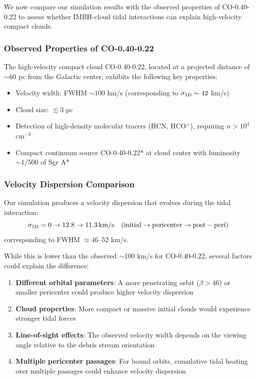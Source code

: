 \documentclass[twocolumn,amsmath,amssymb,prd,superscriptaddress,nofootinbib]{revtex4-2}
\begin{document}
We now compare our simulation results with the observed properties of CO-0.40-0.22 \cite{Oka2016,Oka2017} to assess whether IMBH-cloud tidal interactions can explain high-velocity compact clouds.

\subsubsection{Observed Properties of CO-0.40-0.22}

The high-velocity compact cloud CO-0.40-0.22, located at a projected distance of $\sim$60 pc from the Galactic center, exhibits the following key properties:
\begin{itemize}
    \item Velocity width: FWHM $\sim 100$ km/s (corresponding to $\sigma_{\rm 1D} \sim 42$ km/s)
    \item Cloud size: $\lesssim 3$ pc
    \item Detection of high-density molecular tracers (HCN, HCO$^+$), requiring $n > 10^4$ cm$^{-3}$
    \item Compact continuum source CO-0.40-0.22* at cloud center with luminosity $\sim 1/500$ of Sgr A*
\end{itemize}

\subsubsection{Velocity Dispersion Comparison}

Our simulation produces a velocity dispersion that evolves during the tidal interaction:
\begin{equation}
    \sigma_{\rm 1D} = 0 \rightarrow 12.8 \rightarrow 11.3\,{\rm km/s} \quad ({\rm initial} \rightarrow {\rm pericenter} \rightarrow {\rm post-peri})
\end{equation}
corresponding to FWHM $\approx 46$--$52$ km/s.

While this is lower than the observed $\sim$100 km/s for CO-0.40-0.22, several factors could explain the difference:
\begin{enumerate}
    \item \textbf{Different orbital parameters}: A more penetrating orbit ($\beta > 46$) or smaller pericenter could produce higher velocity dispersion
    \item \textbf{Cloud properties}: More compact or massive initial clouds would experience stronger tidal forces
    \item \textbf{Line-of-sight effects}: The observed velocity width depends on the viewing angle relative to the debris stream orientation
    \item \textbf{Multiple pericenter passages}: For bound orbits, cumulative tidal heating over multiple passages could enhance velocity dispersion
\end{enumerate}
\end{document}
